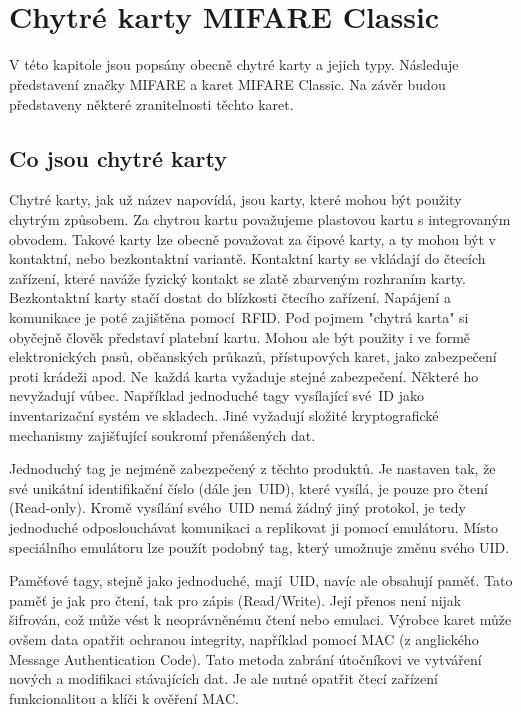 \chapter{Chytré karty MIFARE Classic\textsuperscript{\textregistered}}
\label{chytre_karty}
V této kapitole jsou popsány obecně chytré karty a jejich typy. Následuje představení značky MIFARE a karet MIFARE Classic. Na závěr budou představeny některé zranitelnosti těchto karet.

\section{Co jsou chytré karty}
Chytré karty, jak už název napovídá, jsou karty, které mohou být použity chytrým způsobem. Za chytrou kartu považujeme plastovou kartu s integrovaným obvodem. Takové karty lze obecně považovat za čipové karty, a ty mohou být v kontaktní, nebo bezkontaktní variantě. Kontaktní karty se vkládají do čtecích zařízení, které naváže fyzický kontakt se zlatě zbarveným rozhraním karty. Bezkontaktní karty stačí dostat do blízkosti čtecího zařízení. Napájení a komunikace je poté zajištěna pomocí~RFID. Pod pojmem "chytrá karta" si obyčejně člověk představí platební kartu. Mohou ale být použity i ve formě elektronických pasů, občanských průkazů, přístupových karet, jako zabezpečení proti krádeži apod. Ne~každá karta vyžaduje stejné zabezpečení. Některé ho nevyžadují vůbec. Například jednoduché tagy vysílající své~ID jako inventarizační systém ve skladech. Jiné vyžadují složité  kryptografické mechanismy zajišťující soukromí přenášených dat. 
\par
Jednoduchý tag je nejméně zabezpečený z těchto produktů. Je nastaven tak, že své unikátní identifikační číslo (dále jen~UID), které vysílá, je pouze pro čtení {(Read-only)}. Kromě vysílání svého~UID nemá žádný jiný protokol, je tedy jednoduché odposlouchávat komunikaci a replikovat ji pomocí emulátoru. Místo speciálního emulátoru lze použít podobný tag, který umožnuje změnu svého UID.
\par
Paměťové tagy, stejně jako jednoduché, mají~UID, navíc ale obsahují paměť. Tato paměť je jak pro čtení, tak pro zápis {(Read/Write)}. Její přenos není nijak šifrován, což může vést k neoprávněnému čtení nebo emulaci. Výrobce karet může ovšem data opatřit ochranou integrity, například pomocí MAC (z anglického Message Authentication Code). Tato metoda zabrání útočníkovi ve vytváření nových a modifikaci stávajících dat. Je ale nutné opatřit čtecí zařízení funkcionalitou a klíči k ověření MAC\cite{Mifare_Classic_story}.
